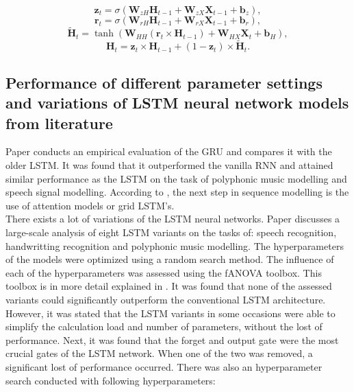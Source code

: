 \begin{equation}
	\textbf{z}_{t} = \sigma(\textbf{W}_{zH}\textbf{H}_{t-1}+\textbf{W}_{zX}\textbf{X}_{t-1}+\textbf{b}_{z}),
\end{equation}
\begin{equation}
	\textbf{r}_{t} = \sigma(\textbf{W}_{rH}\textbf{H}_{t-1}+\textbf{W}_{rX}\textbf{X}_{t-1}+\textbf{b}_{r}),
\end{equation}
\begin{equation}
	\tilde{\textbf{H}}_{t}=\tanh(\textbf{W}_{HH}(\textbf{r}_t\times\textbf{H}_{t-1})+\textbf{W}_{HX}\textbf{X}_t+\textbf{b}_H),
\end{equation}
\begin{equation}
	\textbf{H}_t=\textbf{z}_t\times\textbf{H}_{t-1}+(1-\textbf{z}_t)\times\tilde{\textbf{H}}_t.
\end{equation}

\subsection{Performance of different parameter settings and variations of LSTM neural network models from literature}\label{s:Performance results between different models}
Paper \cite{Chung2014} conducts an empirical evaluation of the GRU and compares it with the older LSTM. It was found that it outperformed the vanilla RNN and attained similar performance as the LSTM on the task of polyphonic music modelling and speech signal modelling. 
According to \cite{Olah}, the next step in sequence modelling is the use of attention models or grid LSTM's.\\

There exists a lot of variations of the LSTM neural networks. Paper \cite{Greff2017} discusses a large-scale analysis of eight LSTM variants on the tasks of: speech recognition, handwritting recognition and polyphonic music modelling. The hyperparameters of the models were optimized using a random search method. The influence of each of the hyperparameters was assessed using the fANOVA toolbox. This toolbox is in more detail explained in \cite{Hutter2014}. It was found that none of the assessed variants could significantly outperform the conventional LSTM architecture. However, it was stated that the LSTM variants in some occasions were able to simplify the calculation load and number of parameters, without the lost of performance. Next, it was found that the forget and output gate were the most crucial gates of the LSTM network. When one of the two was removed, a significant lost of performance occurred. There was also an hyperparameter search conducted with following hyperparameters:


